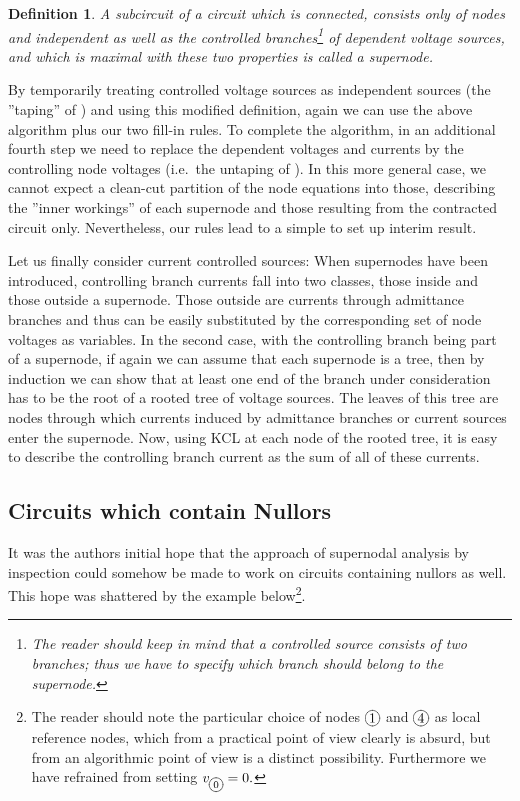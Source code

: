 \documentclass[10pt,journal,twocolumn,pagenumbers]{IEEEtran}
\newtheorem{definition}[theorem]{Definition}
\begin{document}
\begin{definition}
A subcircuit of a circuit which is connected, consists only of nodes and independent as well as the controlled branches\footnote{
The reader should keep in mind that a controlled source consists of two branches; thus we have to specify which branch should belong to the supernode.} 
of dependent voltage sources, and which is maximal with these two properties is called a {\em supernode.}
\end{definition}

By temporarily treating controlled voltage sources as independent sources (the ''taping'' of \cite{Davis}) and using this modified definition, again we can use the above algorithm plus our two fill-in rules. To complete the algorithm, in an add\-itio\-nal fourth step we need to replace the dependent voltages and currents by the controlling node voltages (i.e.\ the untaping of \cite{Davis}). In this more general case, we cannot expect a clean-cut partition of the node equations into those, describing the ''inner workings'' of each supernode and those resulting from the contracted circuit only. Never\-the\-less, our rules lead to a simple to set up interim result. 

Let us finally consider current controlled sources:
When super\-nodes have been introduced, controlling branch currents fall into two classes, those inside and those outside a supernode. Those outside are currents through admittance branches and thus can be easily substituted by the corresponding set of node voltages as variables. 
In the second case, with the controlling branch being part of a super\-node, if again we can assume that each supernode is a tree, then by induction we can show that at least one end of the branch under consideration has to be the root of a rooted tree of voltage sources. The leaves of this tree are nodes through which currents induced by admittance branches or current sources enter the supernode. Now, using KCL at each node of the rooted tree, it is easy to describe the controlling branch current as the sum of all of these currents.

\subsection{Circuits which contain Nullors}
It was the authors initial hope that the approach of supernodal analysis by inspection could somehow be made to work on circuits containing nullors as well. This hope was shattered by the example below\footnote{The reader should note the particular choice of nodes ${\xy*+{1}*\cir{}\endxy}$ and ${\xy*+{{4}}*\cir{}\endxy}$ as local reference nodes, which from a practical point of view clearly is absurd, but from an algorithmic point of view is a distinct possibility. Furthermore we have refrained from setting $v_{\xy*+{\scriptstyle{0}}*\cir{}\endxy}=0.$}.
\end{document}
